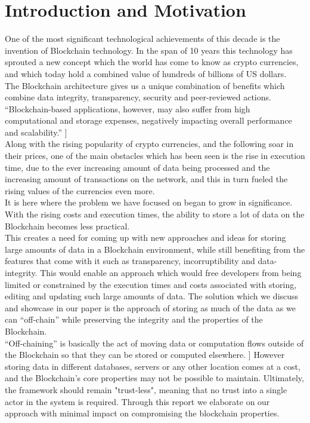 \section{Introduction and Motivation}

One of the most significant technological achievements of this decade is the invention of Blockchain technology. In the span of 10 years this technology has sprouted a new concept which the world has come to know as crypto currencies, and which today hold a combined value of hundreds of billions of US dollars. \\

The Blockchain architecture gives us a unique combination of benefits which combine data integrity, transparency, security and peer-reviewed actions. 
“Blockchain-based applications, however, may also suffer from high computational and storage expenses, negatively impacting overall performance and scalability.” \cite{Eberhardt2017}]\\

Along with the rising popularity of crypto currencies, and the following soar in their prices, one of the main obstacles which has been seen is the rise in execution time, due to the ever increasing amount of data being processed and the increasing amount of transactions on the network, and this in turn fueled the rising values of the currencies even more.  \\

It is here where the problem we have focused on began to grow in significance. With the rising costs and execution times, the ability to store a lot of data on the Blockchain becomes less practical. \\

This creates a need for coming up with new approaches and ideas for storing large amounts of data in a Blockchain environment, while still benefiting from the features that come with it such as transparency, incorruptibility and data-integrity. This would enable an approach which would free developers from being limited or constrained by the execution times and costs associated with storing, editing and updating such large amounts of data. The solution which we discuss and showcase in our paper is the approach of storing as much of the data as we can “off-chain” while preserving the integrity and the properties of the Blockchain.\\

“Off-chaining” is basically the act of moving data or computation flows outside of the Blockchain so that they can be stored or computed elsewhere. \cite{Eberhardt2017}] However storing data in different databases, servers or any other location comes at a cost, and the Blockchain’s core properties may not be possible to maintain. Ultimately, the framework should remain "trust-less", meaning that no trust into a single actor in the system is required. Through this report we elaborate on our approach with minimal impact on compromising the blockchain properties.\\

